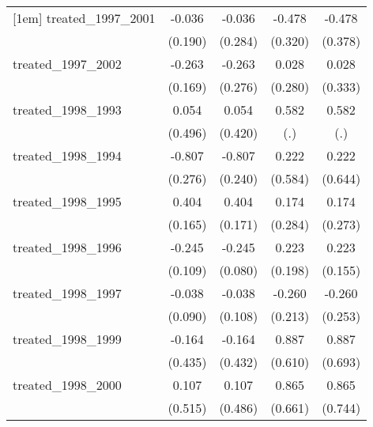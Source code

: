 {\begin{tabular}{l*{4}{c}}
[1em]
treated\_1997\_2001&      -0.036         &      -0.036         &      -0.478         &      -0.478         \\
            &     (0.190)         &     (0.284)         &     (0.320)         &     (0.378)         \\
[1em]
treated\_1997\_2002&      -0.263         &      -0.263         &       0.028         &       0.028         \\
            &     (0.169)         &     (0.276)         &     (0.280)         &     (0.333)         \\
[1em]
treated\_1998\_1993&       0.054         &       0.054         &       0.582         &       0.582         \\
            &     (0.496)         &     (0.420)         &         (.)         &         (.)         \\
[1em]
treated\_1998\_1994&      -0.807\sym{**} &      -0.807\sym{***}&       0.222         &       0.222         \\
            &     (0.276)         &     (0.240)         &     (0.584)         &     (0.644)         \\
[1em]
treated\_1998\_1995&       0.404\sym{*}  &       0.404\sym{*}  &       0.174         &       0.174         \\
            &     (0.165)         &     (0.171)         &     (0.284)         &     (0.273)         \\
[1em]
treated\_1998\_1996&      -0.245\sym{*}  &      -0.245\sym{**} &       0.223         &       0.223         \\
            &     (0.109)         &     (0.080)         &     (0.198)         &     (0.155)         \\
[1em]
treated\_1998\_1997&      -0.038         &      -0.038         &      -0.260         &      -0.260         \\
            &     (0.090)         &     (0.108)         &     (0.213)         &     (0.253)         \\
[1em]
treated\_1998\_1999&      -0.164         &      -0.164         &       0.887         &       0.887         \\
            &     (0.435)         &     (0.432)         &     (0.610)         &     (0.693)         \\
[1em]
treated\_1998\_2000&       0.107         &       0.107         &       0.865         &       0.865         \\
            &     (0.515)         &     (0.486)         &     (0.661)         &     (0.744)         \\

\end{tabular}}

